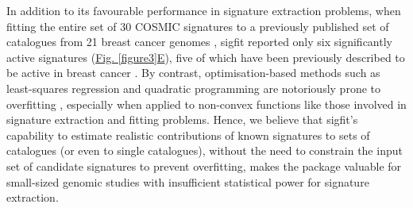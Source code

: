 In addition to its favourable performance in signature extraction problems, when fitting the entire set of 30 COSMIC signatures to a previously published set of catalogues from 21 breast cancer genomes \cite{Nik-Zainal2012:mp21bc}, sigfit reported only six significantly active signatures (\hyperref[figure3]{Fig. \ref*{figure3}E}), five of which have been previously described to be active in breast cancer \cite{Nik-Zainal2016, Alexandrov2013}. By contrast, optimisation-based methods such as least-squares regression and quadratic programming are notoriously prone to overfitting \cite{Harrell2014}, especially when applied to non-convex functions like those involved in signature extraction and fitting problems. Hence, we believe that sigfit's capability to estimate realistic contributions of known signatures to sets of catalogues (or even to single catalogues), without the need to constrain the input set of candidate signatures to prevent overfitting, makes the package valuable for small-sized genomic studies with insufficient statistical power for signature extraction.

